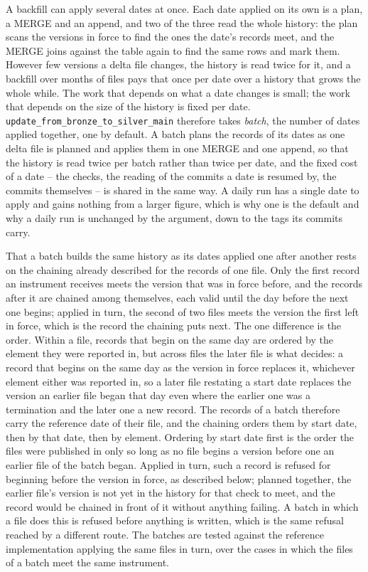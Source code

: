 A backfill can apply several dates at once. Each date applied on its own is a plan, a MERGE and an append, and two of the three read the whole history: the plan scans the versions in force to find the ones the date's records meet, and the MERGE joins against the table again to find the same rows and mark them. However few versions a delta file changes, the history is read twice for it, and a backfill over months of files pays that once per date over a history that grows the whole while. The work that depends on what a date changes is small; the work that depends on the size of the history is fixed per date. \verb|update_from_bronze_to_silver_main| therefore takes \emph{batch}, the number of dates applied together, one by default. A batch plans the records of its dates as one delta file is planned and applies them in one MERGE and one append, so that the history is read twice per batch rather than twice per date, and the fixed cost of a date -- the checks, the reading of the commits a date is resumed by, the commits themselves -- is shared in the same way. A daily run has a single date to apply and gains nothing from a larger figure, which is why one is the default and why a daily run is unchanged by the argument, down to the tags its commits carry.

That a batch builds the same history as its dates applied one after another rests on the chaining already described for the records of one file. Only the first record an instrument receives meets the version that was in force before, and the records after it are chained among themselves, each valid until the day before the next one begins; applied in turn, the second of two files meets the version the first left in force, which is the record the chaining puts next. The one difference is the order. Within a file, records that begin on the same day are ordered by the element they were reported in, but across files the later file is what decides: a record that begins on the same day as the version in force replaces it, whichever element either was reported in, so a later file restating a start date replaces the version an earlier file began that day even where the earlier one was a termination and the later one a new record. The records of a batch therefore carry the reference date of their file, and the chaining orders them by start date, then by that date, then by element. Ordering by start date first is the order the files were published in only so long as no file begins a version before one an earlier file of the batch began. Applied in turn, such a record is refused for beginning before the version in force, as described below; planned together, the earlier file's version is not yet in the history for that check to meet, and the record would be chained in front of it without anything failing. A batch in which a file does this is refused before anything is written, which is the same refusal reached by a different route. The batches are tested against the reference implementation applying the same files in turn, over the cases in which the files of a batch meet the same instrument.

